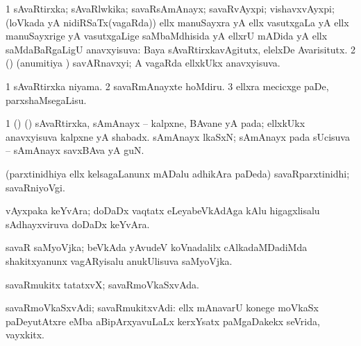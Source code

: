 {{\bentry
{} 
\gl{\gu}
\expl{}
\bmng
\bnum
\num{1} sAvaRtirxka; sAvaRlwkika; savaRsAmAnayx; savaRvAyxpi; vishavxvAyxpi; (loVkada yA nidiRSaTx(vagaRda)) ellx manuSayxra yA ellx vasutxgaLa yA ellx manuSayxrige yA vasutxgaLige saMbaMdhisida yA ellxrU mADida yA ellx saMdaBaRgaLigU anavxyisuva:  Baya sAvaRtirxkavAgitutx, elelxDe Avarisitutx. 
\num{2} (\takaR) (anumitiya \vi) savARnavxyi; A vagaRda ellxkUkx anavxyisuva. 
\enum
\emng

\noindent
\gl{\pagu}
\expl{}
\bmng
\bnum
\num{1}  sAvaRtirxka niyama. 
\num{2}  savaRmAnayxte hoMdiru. 
\num{3}  ellxra mecicxge paDe, parxshaMsegaLisu. 
\enum
\emng
\eentry

\bentry
{} 
\gl{\nA}
\expl{}
\bmng
\bnum
\num{1} (\takaR)  
 (\tashA) 
\banum
{} sAvaRtirxka, sAmAnayx -- kalpxne, BAvane yA pada; ellxkUkx anavxyisuva kalpxne yA shabadx. 
 sAmAnayx lkaSxN; sAmAnayx pada sUcisuva -- sAmAnayx savxBAva yA guN. 
\eanum
\numie
\enum
\emng
\eentry

\bentry
{}
\gl{\nA}
\expl{}
\bmng
(parxtinidhiya ellx kelsagaLanunx mADalu adhikAra paDeda) savaRparxtinidhi; savaRniyoVgi. 
\emng
\eentry

\bentry
{}
\gl{\nA}
\expl{}
\bmng
vAyxpaka keYvAra; doDaDx vaqtatx eLeyabeVkAdAga kAlu higagxlisalu sAdhayxviruva doDaDx keYvAra. 
\emng
\eentry

\bentry
{}
\gl{\nA}
\expl{}
\bmng
savaR saMyoVjka; beVkAda yAvudeV koVnadalilx cAlkadaMDadiMda shakitxyanunx vagARyisalu anukUlisuva saMyoVjka. 
\emng
\eentry

\bentry
{} 
\gl{\sakirx}
\expl{}
\bmng
{} 
\emng
\eentry

\bentry
{} 
\gl{\nA}
\expl{}
\bmng
savaRmukitx tatatxvX; savaRmoVkaSxvAda. 
\emng
\eentry

\bentry
{} 
\gl{\nA}
\expl{}
\bmng
savaRmoVkaSxvAdi; savaRmukitxvAdi: ellx mAnavarU konege moVkaSx paDeyutAtxre eMba aBipArxyavuLaLx kerxYsatx paMgaDakekx seVrida, vayxkitx. 
\emng
\eentry

}}
